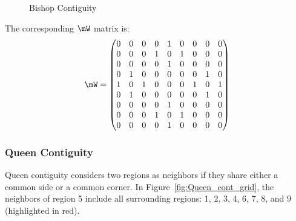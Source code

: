 \documentclass[english,12pt]{book}\usepackage[]{graphicx}\usepackage[]{xcolor}
\begin{document}
\begin{figure}[h]
\caption{Bishop Contiguity}
\label{fig:Bishop_cont_grid}
\centering
{}
\end{figure}

The corresponding $\mW$ matrix is:
\begin{equation*}
\mW = 
  \begin{pmatrix}
     0 & 0 & 0 & 0 & 1 & 0 & 0 & 0 & 0 \\
     0 & 0 & 0 & 1 & 0 & 1 & 0 & 0 & 0 \\
     0 & 0 & 0 & 0 & 1 & 0 & 0 & 0 & 0 \\
     0 & 1 & 0 & 0 & 0 & 0 & 0 & 1 & 0 \\
     1 & 0 & 1 & 0 & 0 & 0 & 1 & 0 & 1 \\
     0 & 1 & 0 & 0 & 0 & 0 & 0 & 1 & 0 \\
     0 & 0 & 0 & 0 & 1 & 0 & 0 & 0 & 0 \\
     0 & 0 & 0 & 1 & 0 & 1 & 0 & 0 & 0 \\
     0 & 0 & 0 & 0 & 1 & 0 & 0 & 0 & 0 \\
  \end{pmatrix}
\end{equation*}


\subsubsection{Queen Contiguity}

Queen contiguity considers two regions as neighbors if they share either a common side or a common corner. In Figure~\ref{fig:Queen_cont_grid}, the neighbors of region 5 include all surrounding regions: 1, 2, 3, 4, 6, 7, 8, and 9 (highlighted in red).
\end{document}
